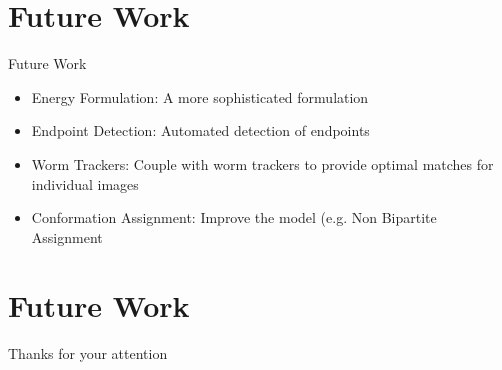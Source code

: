 \documentclass[xcolor=table]{beamer}
\begin{document}
\section{Future Work}
\begin{frame}{Future Work}

  \begin{itemize}
  \item Energy Formulation: A more
    sophisticated formulation \pause
  \item Endpoint Detection: Automated detection 
    of endpoints \pause
  \item Worm Trackers: Couple with worm
    trackers to provide optimal matches
    for individual images \pause
  \item Conformation Assignment: Improve the
    model (e.g. Non Bipartite Assignment
  \end{itemize}
\end{frame}

\section{Future Work}
\begin{frame}
\begin{center}
\LARGE Thanks for your attention
\end{center}

\end{frame}
\end{document}
